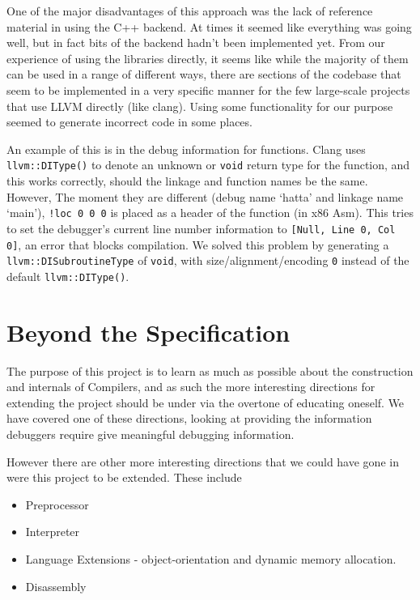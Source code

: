 \documentclass[a4wide, 11pt]{article}
\begin{document}
One of the major disadvantages of this approach was the lack of reference material in using the C++ backend. At times it seemed like everything was going well, but in fact bits of the backend hadn't been implemented yet. From our experience of using the libraries directly, it seems like while the majority of them can be used in a range of different ways, there are sections of the codebase that seem to be implemented in a very specific manner for the few large-scale projects that use LLVM directly (like clang). Using some functionality for our purpose seemed to generate incorrect code in some places.

An example of this is in the debug information for functions. Clang uses \texttt{llvm::DIType()} to denote an unknown or \texttt{void} return type for the function, and this works correctly, should the linkage and function names be the same. However, The moment they are different (debug name `hatta' and linkage name `main'), \texttt{!loc 0 0 0} is placed as a header of the function (in x86 Asm). This tries to set the debugger's current line number information to \texttt{[Null, Line 0, Col 0]}, an error that blocks compilation. We solved this problem by generating a \texttt{llvm::DISubroutineType} of \texttt{void}, with size/alignment/encoding \texttt{0} instead of the default \texttt{llvm::DIType()}. 

\section{Beyond the Specification}

The purpose of this project is to learn as much as possible about the construction and internals of Compilers, and as such the more interesting directions for extending the project should be under via the overtone of educating oneself. We have covered one of these directions, looking at providing the information debuggers require give meaningful debugging information. 

However there are other more interesting directions that we could have gone in were this project to be extended. These include
\begin{itemize}
\item Preprocessor
\item Interpreter
\item Language Extensions - object-orientation and dynamic memory allocation.
\item Disassembly
\end{itemize}
\end{document}
